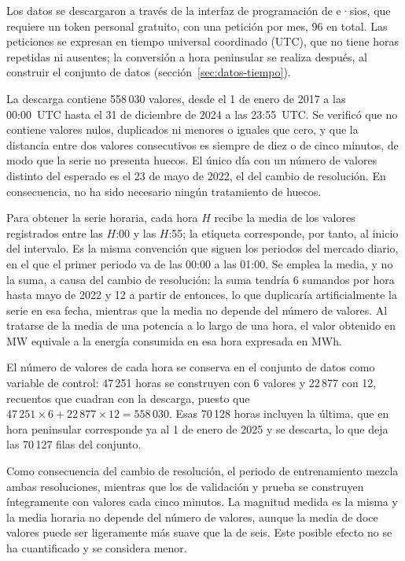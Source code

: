 Los datos se descargaron a través de la interfaz de programación de e·sios,
que requiere un token personal gratuito, con una petición por mes, 96 en
total. Las peticiones se expresan en tiempo universal coordinado (UTC), que
no tiene horas repetidas ni ausentes; la conversión a hora peninsular se
realiza después, al construir el conjunto de datos
(sección~\ref{sec:datos-tiempo}).

La descarga contiene 558\,030 valores, desde el 1 de enero de 2017 a las
00:00~UTC hasta el 31 de diciembre de 2024 a las 23:55~UTC. Se verificó que
no contiene valores nulos, duplicados ni menores o iguales que cero, y que
la distancia entre dos valores consecutivos es siempre de diez o de cinco
minutos, de modo que la serie no presenta huecos. El único día con un número
de valores distinto del esperado es el 23 de mayo de 2022, el del cambio de
resolución. En consecuencia, no ha sido necesario ningún tratamiento de
huecos.

Para obtener la serie horaria, cada hora $H$ recibe la media de los valores
registrados entre las $H$:00 y las $H$:55; la etiqueta corresponde, por
tanto, al inicio del intervalo. Es la misma convención que siguen los
periodos del mercado diario, en el que el primer periodo va de las 00:00 a
las 01:00. Se emplea la media, y no la suma, a causa del cambio de
resolución: la suma tendría 6 sumandos por hora hasta mayo de 2022 y 12 a
partir de entonces, lo que duplicaría artificialmente la serie en esa fecha,
mientras que la media no depende del número de valores. Al tratarse de la
media de una potencia a lo largo de una hora, el valor obtenido en MW
equivale a la energía consumida en esa hora expresada en MWh.

El número de valores de cada hora se conserva en el conjunto de datos como
variable de control: 47\,251 horas se construyen con 6 valores y 22\,877 con
12, recuentos que cuadran con la descarga, puesto que
$47\,251 \times 6 + 22\,877 \times 12 = 558\,030$. Esas 70\,128 horas
incluyen la última, que en hora peninsular corresponde ya al 1 de enero de
2025 y se descarta, lo que deja las 70\,127 filas del conjunto.

Como consecuencia del cambio de resolución, el periodo de entrenamiento
mezcla ambas resoluciones, mientras que los de validación y prueba se
construyen íntegramente con valores cada cinco minutos. La magnitud medida es
la misma y la media horaria no depende del número de valores, aunque la media
de doce valores puede ser ligeramente más suave que la de seis. Este posible
efecto no se ha cuantificado y se considera menor.

